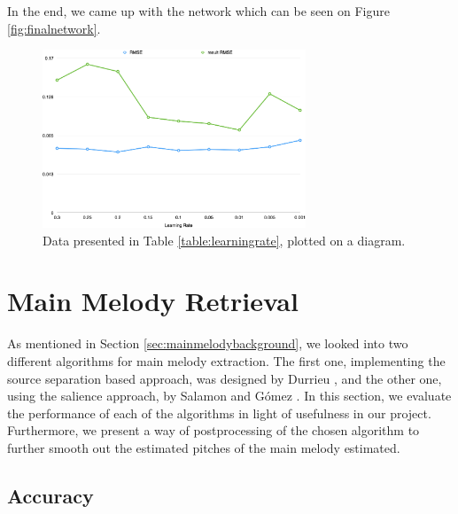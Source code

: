 In the end, we came up with the network which can be seen on Figure \ref{fig:finalnetwork}.

\begin{figure}[h]
	\centering
   \includegraphics[width=0.7\textwidth]{Figures/learningrate}
\caption{Data presented in Table \ref{table:learningrate}, plotted on a diagram.}
\end{figure}

\vspace{20pt}

\section{Main Melody Retrieval}
\vspace{10pt}

As mentioned in Section \ref{sec:mainmelodybackground}, we looked into two different algorithms for main melody extraction. The first one, implementing the source separation based approach, was designed by Durrieu \cite{durrieu}, and the other one, using the salience approach, by Salamon and G\'{o}mez \cite{salamon}. In this section, we evaluate the performance of each of the algorithms in light of usefulness in our project. Furthermore, we present a way of postprocessing of the chosen algorithm to further smooth out the estimated pitches of the main melody estimated.

\vspace{10pt}


\subsection{Accuracy}

